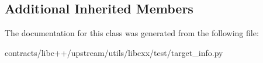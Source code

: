 \subsection*{Additional Inherited Members}


The documentation for this class was generated from the following file\+:\begin{DoxyCompactItemize}
\item 
contracts/libc++/upstream/utils/libcxx/test/target\+\_\+info.\+py\end{DoxyCompactItemize}
